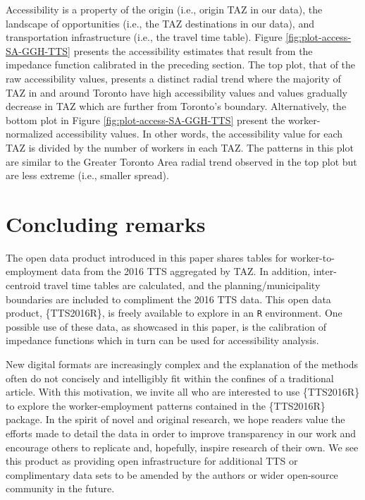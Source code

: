 \documentclass[Royal,times,sageh]{sagej}
\begin{document}
Accessibility is a property of the origin (i.e., origin TAZ in our
data), the landscape of opportunities (i.e., the TAZ destinations in our
data), and transportation infrastructure (i.e., the travel time table).
Figure \ref{fig:plot-access-SA-GGH-TTS} presents the accessibility
estimates that result from the impedance function calibrated in the
preceding section. The top plot, that of the raw accessibility values,
presents a distinct radial trend where the majority of TAZ in and around
Toronto have high accessibility values and values gradually decrease in
TAZ which are further from Toronto's boundary. Alternatively, the bottom
plot in Figure \ref{fig:plot-access-SA-GGH-TTS} present the
worker-normalized accessibility values. In other words, the
accessibility value for each TAZ is divided by the number of workers in
each TAZ. The patterns in this plot are similar to the Greater Toronto
Area radial trend observed in the top plot but are less extreme (i.e.,
smaller spread).

\hypertarget{concluding-remarks}{%
\section{Concluding remarks}\label{concluding-remarks}}

The open data product introduced in this paper shares tables for
worker-to-employment data from the 2016 TTS aggregated by TAZ. In
addition, inter-centroid travel time tables are calculated, and the
planning/municipality boundaries are included to compliment the 2016 TTS
data. This open data product, \{TTS2016R\}, is freely available to
explore in an \texttt{R} environment. One possible use of these data, as
showcased in this paper, is the calibration of impedance functions which
in turn can be used for accessibility analysis.

New digital formats are increasingly complex and the explanation of the
methods often do not concisely and intelligibly fit within the confines
of a traditional article. With this motivation, we invite all who are
interested to use \{TTS2016R\} to explore the worker-employment patterns
contained in the \{TTS2016R\} package. In the spirit of novel and
original research, we hope readers value the efforts made to detail the
data in order to improve transparency in our work and encourage others
to replicate and, hopefully, inspire research of their own. We see this
product as providing open infrastructure for additional TTS or
complimentary data sets to be amended by the authors or wider
open-source community in the future.

\newpage



\end{document}
